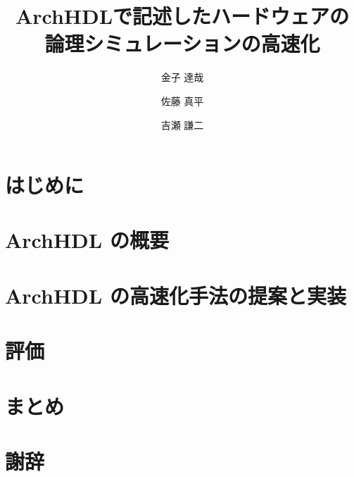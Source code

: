 \documentclass[submit,techreq,noauthor,papersize,]{ipsj}
\title{ArchHDLで記述したハードウェアの\\ 論理シミュレーションの高速化}
\author{金子 達哉}{Kaneko Tatsuya}{TOKYOTECH_B}%
\author{佐藤 真平}{Sato Shimpei}{TOKYOTECH}%
\author{吉瀬 謙二}{Kise Kenji}{TOKYOTECH}%
\author{}
\date{}
\begin{document}
\begin{abstract}
 
\end{abstract}

\maketitle

\section{はじめに}



\section{ArchHDL の概要}

\label{s:summary}



\section{ArchHDL の高速化手法の提案と実装}

\label{s:method}



\section{評価}

\label{s:evaluation}



\section{まとめ}

\label{s:conclusion}



\section*{謝辞}

\label{s:acknowledgment}




\end{document}
